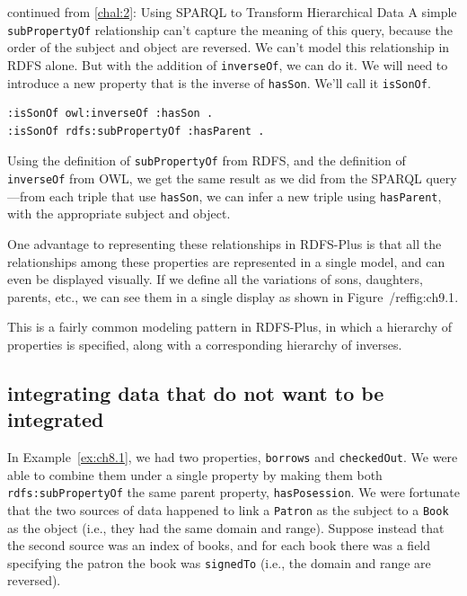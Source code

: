 \begin{challenge}{continued from \protect\ref{chal:2}: Using SPARQL to Transform Hierarchical Data}
A simple \texttt{subPropertyOf} relationship can't capture the meaning of this
query, because the order of the subject and object are reversed. We
can't model this relationship in RDFS alone. But with the addition of
\texttt{inverseOf}, we can do it. We will need to introduce a new property that
is the inverse of \texttt{hasSon}. We'll call it \texttt{isSonOf}.

\begin{lstlisting}
:isSonOf owl:inverseOf :hasSon .
:isSonOf rdfs:subPropertyOf :hasParent .
\end{lstlisting}

Using the definition of \texttt{subPropertyOf} from RDFS, and the definition of
\texttt{inverseOf} from OWL, we get the same result as we did from the SPARQL
query---from each triple that use \texttt{hasSon}, we can infer a new triple
using \texttt{hasParent}, with the appropriate subject and object.

One advantage to representing these relationships in RDFS-Plus is that
all the relationships among these properties are represented in a single
model, and can even be displayed visually. If we define all the
variations of sons, daughters, parents, etc., we can see them in a
single display as shown in Figure~/ref{fig:ch9.1}.

This is a fairly common modeling pattern in RDFS-Plus, in which a
hierarchy of properties is specified, along with a corresponding
hierarchy of inverses.
\end{challenge}

\subsection{integrating data that do not want to be integrated}

In  Example~\ref{ex:ch8.1}, we had two properties, \texttt{borrows} and
\texttt{checkedOut}. We were able to combine them under a single property by
making them both \texttt{rdfs:subPropertyOf} the same parent property,
\texttt{hasPosession}. We were fortunate that the two sources of data happened to
link a \texttt{Patron} as the subject to a \texttt{Book} as the object (i.e., they had the
same domain and range). Suppose instead that the second source was an
index of books, and for each book there was a field specifying the
patron the book was \texttt{signedTo} (i.e., the domain and range are reversed).

